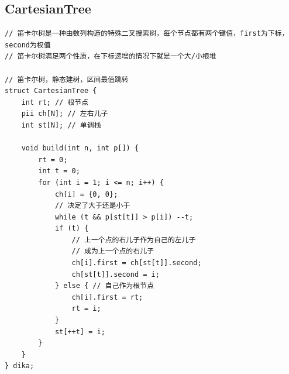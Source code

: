 \documentclass[twoside]{article}
\begin{document}
\subsection{CartesianTree}
\begin{lstlisting}
// 笛卡尔树是一种由数列构造的特殊二叉搜索树，每个节点都有两个键值，first为下标，second为权值
// 笛卡尔树满足两个性质，在下标递增的情况下就是一个大/小根堆

// 笛卡尔树，静态建树，区间最值跳转
struct CartesianTree {
    int rt; // 根节点
    pii ch[N]; // 左右儿子
    int st[N]; // 单调栈

    void build(int n, int p[]) {
        rt = 0;
        int t = 0;
        for (int i = 1; i <= n; i++) {
            ch[i] = {0, 0};
            // 决定了大于还是小于
            while (t && p[st[t]] > p[i]) --t;
            if (t) { 
                // 上一个点的右儿子作为自己的左儿子
				// 成为上一个点的右儿子
                ch[i].first = ch[st[t]].second;
                ch[st[t]].second = i;
            } else { // 自己作为根节点
                ch[i].first = rt;
                rt = i;
            }
            st[++t] = i;
        }
    }
} dika;\end{lstlisting}
\end{document}
